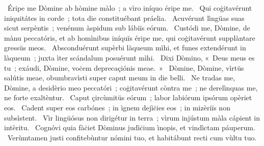 ~Éripe me Dòmine ab hòmine màlo~; a vìro iníquo éripe me. 
~Qui coġitavérunt iniquitátes in corde~; tota die constituébant práelia. 
~Acuvérunt lìngüas suas sicut serpèntis~; venénum àspidum sub lábiïs eórum. 
~Custódi me, Dòmine, de mànu peccatóris, et ab homìnibus iníquïs éripe me, qui coġitavérunt supplàntare gressüs meos. 
~Absconduérunt supèrbi làqueum mìhi, et funes extendérunt in làqueum~; juxta ìter scándalum posuérunt mìhi. 
~Dixi Dòmino, «~Deus meus es tu~; exáudi, Dòmine, voċem deprecaçiónis meae.~»
~Dòmine, Dòmine, vìrtüs salútis meae, obumbravìsti super caput meum in die belli. 
~Ne tradas me, Dòmine, a desidèrio meo peccatóri~; coġitavérunt còntra me~; ne derelìnquas me, ne forte exaltèntur. 
~Caput çircùmitüs eórum~; labor labiórum ipsórum opèriet eos. 
~Cadent super eos carbónes~; in ìgnem dejìċies eos~; in mizèriïs non subsìstent. 
~Vìr lingüósus non dirigétur in terra~; vìrum injústum màla cápient in intèritu. 
~Cognóvi quia fàċiet Dòminus judìċium ìnopis, et vindìctam páuperum. 
~Verùmtamen justi confitebùntur nómini tuo, et habitábunt recti cum vùltu tuo. 
